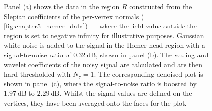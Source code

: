 \begin{figure}[htpb]
	\centering\capstart{}
	\hfill
	\hfill
	\caption[
		A denoising demonstration for a field on the Homer mesh
	]{
		Panel (a) shows the data in the region \(R\) constructed from the Slepian coefficients of the per-vertex normals (\cf{} \cref{fig:chapter5_homer_data}) --- where the field value outside the region is set to negative infinity for illustrative purposes.
		Gaussian white noise is added to the signal in the Homer head region with a signal-to-noise ratio of \(\SI{0.32}{\dB}\), shown in panel (b).
		The scaling and wavelet coefficients of the noisy signal are calculated and are then hard-thresholded with \(N_{\sigma}=1\).
		The corresponding denoised plot is shown in panel (c), where the signal-to-noise ratio is boosted by \(\SI{1.97}{\dB}\) to \(\SI{2.29}{\dB}\).
		Whilst the signal values are defined on the vertices, they have been averaged onto the faces for the plot.
	}\label{fig:chapter5_denoising}
\end{figure}
